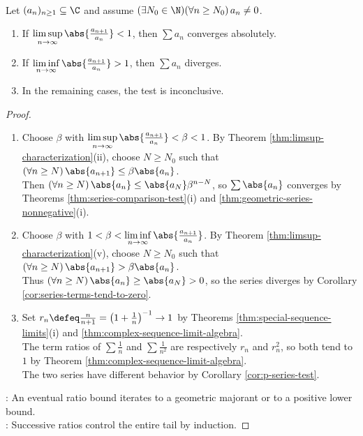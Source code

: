 \begin{theorem} \label{thm:ratio-test} \\
Let $(a_n)_{n\geq1}\subseteq\C$ and assume $(\exists N_0\in\N)(\forall n\geq N_0)\,a_n\neq0$.
\begin{enumerate}[label=(\roman*)]
\setlength{\itemsep}{0pt}
\item If $\limsup\limits_{n\to\infty}\abs{\frac{a_{n+1}}{a_n}}<1$, then $\sum a_n$ converges absolutely.
\item If $\liminf\limits_{n\to\infty}\abs{\frac{a_{n+1}}{a_n}}>1$, then $\sum a_n$ diverges.
\item In the remaining cases, the test is inconclusive.
\end{enumerate}
\begin{proof}
\begin{enumerate}[label=(\roman*)]
\setlength{\itemsep}{0pt}
\item Choose $\beta$ with $\limsup\limits_{n\to\infty}\abs{\frac{a_{n+1}}{a_n}}<\beta<1$. By Theorem \ref{thm:limsup-characterization}(ii), choose $N\geq N_0$ such that $(\forall n\geq N)\,\abs{a_{n+1}}\leq\beta\abs{a_n}$.\\
Then $(\forall n\geq N)\,\abs{a_n}\leq\abs{a_N}\beta^{n-N}$, so $\sum\abs{a_n}$ converges by Theorems \ref{thm:series-comparison-test}(i) and \ref{thm:geometric-series-nonnegative}(i).
\item Choose $\beta$ with $1<\beta<\liminf\limits_{n\to\infty}\abs{\frac{a_{n+1}}{a_n}}$. By Theorem \ref{thm:limsup-characterization}(v), choose $N\geq N_0$ such that $(\forall n\geq N)\,\abs{a_{n+1}}>\beta\abs{a_n}$.\\
Thus $(\forall n\geq N)\,\abs{a_n}\geq\abs{a_N}>0$, so the series diverges by Corollary \ref{cor:series-terms-tend-to-zero}.
\item Set $r_n\defeq\frac{n}{n+1}=\left(1+\frac{1}{n}\right)^{-1}\to1$ by Theorems \ref{thm:special-sequence-limits}(i) and \ref{thm:complex-sequence-limit-algebra}.\\
The term ratios of $\sum\frac{1}{n}$ and $\sum\frac{1}{n^2}$ are respectively $r_n$ and $r_n^2$, so both tend to $1$ by Theorem \ref{thm:complex-sequence-limit-algebra}.\\
The two series have different behavior by Corollary \ref{cor:p-series-test}.
\end{enumerate}
: An eventual ratio bound iterates to a geometric majorant or to a positive lower bound.\\
: Successive ratios control the entire tail by induction.
\end{proof}
\end{theorem}

